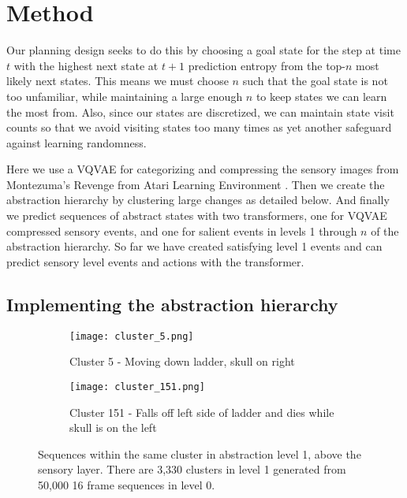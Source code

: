 \documentclass{article}
\begin{document}
\section{Method}

Our planning design seeks to do this by choosing a goal state for the step at time $t$ with the highest next state at $t + 1$ prediction entropy from the top-$n$ most likely next states. This means we must choose $n$ such that the goal state is not too unfamiliar, while maintaining a large enough $n$ to keep states we can learn the most from. Also, since our states are discretized, we can maintain state visit counts so that we avoid visiting states too many times as yet another safeguard against learning randomness.

\hspace{0pt}

Here we use a VQVAE \cite{oord2018neural}\cite{karpathy2021deepvectorquantization} for categorizing and compressing the sensory images from Montezuma's Revenge from Atari Learning Environment \cite{bellemare2013arcade}. Then we create the abstraction hierarchy by clustering large changes as detailed below. And finally we predict sequences of abstract states with two transformers\cite{vaswani2017attention}\cite{karpathy2020mingpt}, one for VQVAE compressed sensory events, and one for salient events in levels 1 through $n$ of the abstraction hierarchy. So far we have created satisfying level 1 events and can predict sensory level events and actions with the transformer.


\subsection{Implementing the abstraction hierarchy}
\label{sec:abstraction-hierarchy}

\begin{figure}
    \centering

    \begin{subfigure}[b]{1.0\textwidth}
        \centering
        \texttt{[image: cluster\_5.png]}
        \caption{Cluster 5 - Moving down ladder, skull on right}
        \label{fig:level-1-cluster-5}
    \end{subfigure}

    \begin{subfigure}[b]{1.0\textwidth}
        \centering
        \texttt{[image: cluster\_151.png]}
        \caption{Cluster 151 - Falls off left side of ladder and dies while skull is on the left}
        \label{fig:level-1-cluster-151}
    \end{subfigure}

    \caption{Sequences within the same cluster in abstraction level 1, above the sensory layer. There are 3,330 clusters in level 1 generated from 50,000 16 frame sequences in level 0.}
    \label{fig:level-1-clusters}
\end{figure}
\end{document}
